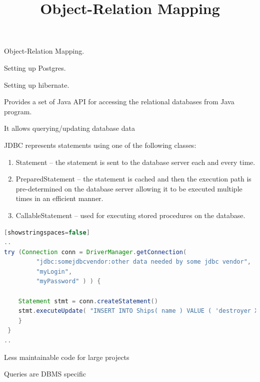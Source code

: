 \documentclass{beamer}
\title{Object-Relation Mapping}
\author{ }
\institute{Hogeschool Rotterdam \\ 
Rotterdam, Netherlands}
\date{}
\begin{document}
\maketitle

\begin{slide}{
\item Object-Relation Mapping.
\item Setting up Postgres.
\item Setting up hibernate.
}\end{slide}



\begin{slide}{
\item Provides a set of Java API for accessing the relational databases from Java program.
\item It allows querying/updating database data 
\item JDBC represents statements using one of the following classes:
\begin{enumerate}
	\pause
	 \item Statement – the statement is sent to the database server each and every time.
	 \pause
	 \item PreparedStatement – the statement is cached and then the execution path is pre-determined on the database server allowing it to be executed multiple times in an efficient manner.
	 \pause
	 \item CallableStatement – used for executing stored procedures on the database.
\end{enumerate}
}
\end{slide}



{
\begin{lstlisting}[language=java][showstringspaces=false]
..
try (Connection conn = DriverManager.getConnection(
	     "jdbc:somejdbcvendor:other data needed by some jdbc vendor",
	     "myLogin",
	     "myPassword" ) ) {
		
	Statement stmt = conn.createStatement()
	stmt.executeUpdate( "INSERT INTO Ships( name ) VALUE ( 'destroyer XYZ' ) " );
	}
 }  
..	
\end{lstlisting}	
}


\begin{slide}{
\item Less maintainable code for large projects
\item Queries are DBMS specific
}
\end{slide}
\end{document}
